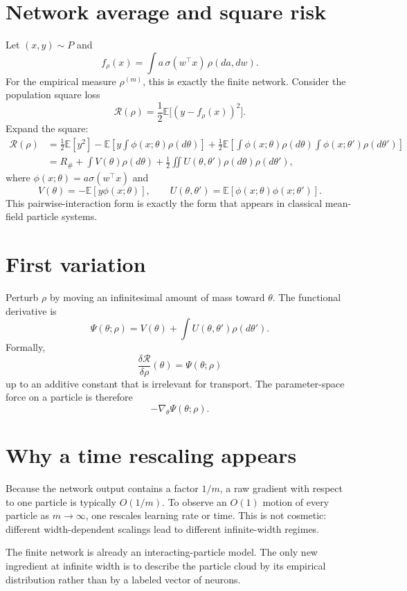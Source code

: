 \documentclass[11pt,a4paper,oneside,openany]{memoir}
\newcommand{\E}{\mathbb{E}}
\theoremstyle{definition}
\begin{document}
\section{Network average and square risk}
Let $(x,y)\sim P$ and
\[
f_\rho(x)=\int a\,\sigma(w^\top x)\,\rho(d a,dw).
\]
For the empirical measure $\rho^{(m)}$, this is exactly the finite network.  Consider the population square loss
\[
\mathcal R(\rho)=\frac12\E\bigl[(y-f_\rho(x))^2\bigr].
\]
Expand the square:
\begin{align*}
\mathcal R(\rho)
&=\frac12\E[y^2]
-\E\left[y\int\phi(x;\theta)\rho(d\theta)\right]
+\frac12\E\left[\int\phi(x;\theta)\rho(d\theta)
\int\phi(x;\theta')\rho(d\theta')\right]\\
&=R_\# +\int V(\theta)\rho(d\theta)
+\frac12\iint U(\theta,\theta')\rho(d\theta)\rho(d\theta'),
\end{align*}
where $\phi(x;\theta)=a\sigma(w^\top x)$ and
\[
V(\theta)=-\E[y\phi(x;\theta)],\qquad
U(\theta,\theta')=\E[\phi(x;\theta)\phi(x;\theta')].
\]
This pairwise-interaction form is exactly the form that appears in classical mean-field particle systems.

\section{First variation}
Perturb $\rho$ by moving an infinitesimal amount of mass toward $\theta$.  The functional derivative is
\[
\Psi(\theta;\rho)
=V(\theta)+\int U(\theta,\theta')\rho(d\theta').
\]
Formally,
\[
\frac{\delta \mathcal R}{\delta \rho}(\theta)=\Psi(\theta;\rho)
\]
up to an additive constant that is irrelevant for transport.  The parameter-space force on a particle is therefore
\[
-\nabla_\theta\Psi(\theta;\rho).
\]

\section{Why a time rescaling appears}
Because the network output contains a factor $1/m$, a raw gradient with respect to one particle is typically $O(1/m)$.  To observe an $O(1)$ motion of every particle as $m\to\infty$, one rescales learning rate or time.  This is not cosmetic: different width-dependent scalings lead to different infinite-width regimes.

\begin{presentbox}
The finite network is already an interacting-particle model.  The only new ingredient at infinite width is to describe the particle cloud by its empirical distribution rather than by a labeled vector of neurons.
\end{presentbox}
\end{document}
